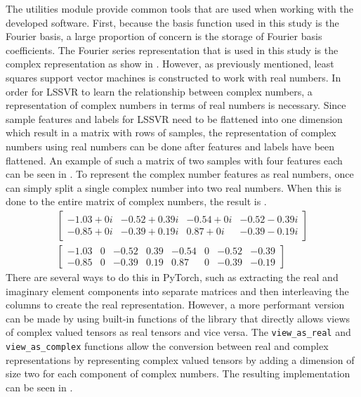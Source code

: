 \noindent The utilities module provide common tools that are used when working with the developed software. First, because the basis function used in this study is the Fourier basis, a large proportion of concern is the storage of Fourier basis coefficients. The Fourier series representation that is used in this study is the complex representation as show in . However, as previously mentioned, least squares support vector machines is constructed to work with real numbers. In order for LSSVR to learn the relationship between complex numbers, a representation of complex numbers in terms of real numbers is necessary. Since sample features and labels for LSSVR need to be flattened into one dimension which result in a matrix with rows of samples, the representation of complex numbers using real numbers can be done after features and labels have been flattened. An example of such a matrix of two samples with four features each can be seen in . To represent the complex number features as real numbers, once can simply split a single complex number into two real numbers. When this is done to the entire matrix of complex numbers, the result is .
\begin{align}
  \begin{bmatrix}
    -1.03+0i & -0.52+0.39i & -0.54+0i & -0.52-0.39i \\
    -0.85+0i & -0.39+0.19i & 0.87+0i  & -0.39-0.19i
  \end{bmatrix}\label{eq:complex_matrix} \\
  \begin{bmatrix}
    -1.03 & 0 & -0.52 & 0.39 & -0.54 & 0 & -0.52 & -0.39 \\
    -0.85 & 0 & -0.39 & 0.19 & 0.87  & 0 & -0.39 & -0.19
  \end{bmatrix}\label{eq:complex_matrix_real_rep}
\end{align}
There are several ways to do this in PyTorch, such as extracting the real and imaginary element components into separate matrices and then interleaving the columns to create the real representation. However, a more performant version can be made by using built-in functions of the library that directly allows views of complex valued tensors as real tensors and vice versa. The \verb|view_as_real| and \verb|view_as_complex| functions allow the conversion between real and complex representations by representing complex valued tensors by adding a dimension of size two for each component of complex numbers. The resulting implementation can be seen in .
